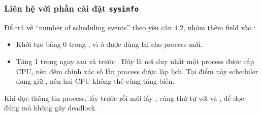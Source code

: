 \subsubsection{Liên hệ với phần cài đặt \texttt{sysinfo}}

Để trả về ``number of scheduling events'' theo yêu cầu 4.2, nhóm thêm field
 vào :
\begin{itemize}
  \item Khởi tạo bằng 0 trong , vì ô  được dùng
        lại cho process mới.
  \item Tăng 1 trong  ngay sau  và
        trước . Đây là nơi duy nhất một process được cấp CPU, nên
         đếm chính xác số lần process được lập lịch. Tại điểm này
        scheduler đang giữ , nên hai CPU không thể cùng tăng biến.
\end{itemize}
Khi đọc thông tin process,  lấy  trước rồi mới
lấy , cùng thứ tự với  và , để đọc
 đúng mà không gây deadlock.

